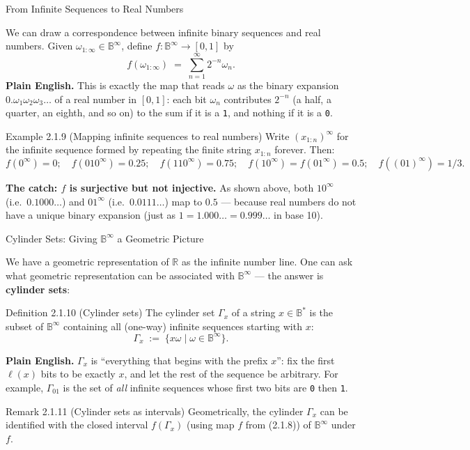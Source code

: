 \documentclass[aspectratio=169,10pt]{beamer}
\newcommand{\Bs}{\mathbb{B}^{*}}
\newcommand{\Binf}{\mathbb{B}^{\infty}}
\newcommand{\Bb}{\mathbb{B}}
\newcommand{\len}{\ell}
\begin{document}
\begin{frame}{From Infinite Sequences to Real Numbers}

We can draw a correspondence between infinite binary sequences and real
numbers. Given $\omega_{1:\infty}\in\Binf$, define $f:\Binf\to[0,1]$ by
\[
  f(\omega_{1:\infty}) \;=\; \sum_{n=1}^{\infty} 2^{-n}\omega_n .
  \tag{2.1.8}
\]
\textbf{Plain English.} This is exactly the map that reads $\omega$ as the
binary expansion $0.\omega_1\omega_2\omega_3\dots$ of a real number in
$[0,1]$: each bit $\omega_n$ contributes $2^{-n}$ (a half, a quarter, an
eighth, and so on) to the sum if it is a \texttt{1}, and nothing if it is a
\texttt{0}.

\begin{block}{Example 2.1.9 (Mapping infinite sequences to real numbers)}
Write $(x_{1:n})^\infty$ for the infinite sequence formed by repeating the
finite string $x_{1:n}$ forever. Then:
\[
  f(0^\infty)=0; \quad f(010^\infty)=0.25; \quad f(110^\infty)=0.75; \quad
  f(10^\infty)=f(01^\infty)=0.5; \quad f((01)^\infty)=1/3.
\]
\end{block}

\textbf{The catch: $f$ is surjective but not injective.} As shown above,
both $10^\infty$ (i.e.\ $0.1000\dots$) and $01^\infty$ (i.e.\
$0.0111\dots$) map to $0.5$ --- because real numbers do not have a unique
binary expansion (just as $1=1.000\dots=0.999\dots$ in base 10).
\end{frame}

\begin{frame}{Cylinder Sets: Giving $\Binf$ a Geometric Picture}

We have a geometric representation of $\mathbb{R}$ as the infinite number
line. One can ask what geometric representation can be associated with
$\Binf$ --- the answer is \textbf{cylinder sets}:

\begin{block}{Definition 2.1.10 (Cylinder sets)}
The cylinder set $\Gamma_x$ of a string $x\in\Bs$ is the subset of
$\Binf$ containing all (one-way) infinite sequences starting with $x$:
\[
  \Gamma_x \;:=\; \{x\omega \mid \omega\in\Binf\}.
\]
\end{block}

\textbf{Plain English.} $\Gamma_x$ is ``everything that begins with the
prefix $x$'': fix the first $\len(x)$ bits to be exactly $x$, and let the
rest of the sequence be arbitrary. For example, $\Gamma_{01}$ is the set of
\emph{all} infinite sequences whose first two bits are \texttt{0} then
\texttt{1}.

\begin{block}{Remark 2.1.11 (Cylinder sets as intervals)}
Geometrically, the cylinder $\Gamma_x$ can be identified with the closed
interval $f(\Gamma_x)$ (using map $f$ from (2.1.8)) of $\Bb^{\infty}$
under $f$.
\end{block}
\end{frame}
\end{document}
